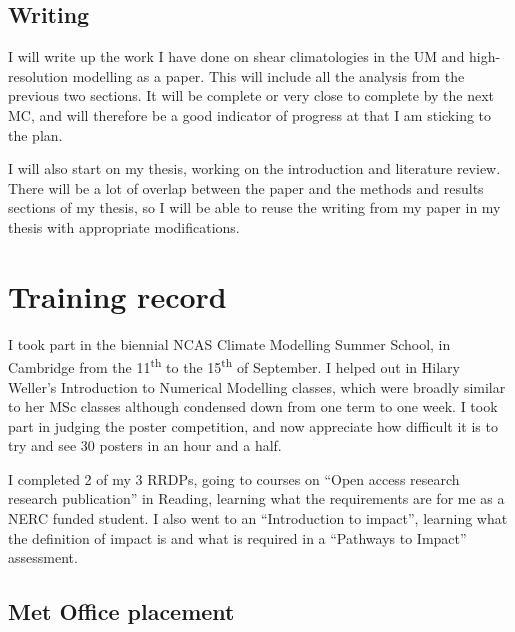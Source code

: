 \documentclass[11pt,a4paper]{article}
\newcommand{\ts}{\textsuperscript}
\begin{document}
\subsection{Writing}
\label{sec:Writing}

I will write up the work I have done on shear climatologies in the UM and high-resolution modelling as a paper. This will include all the analysis from the previous two sections. It will be complete or very close to complete by the next MC, and will therefore be a good indicator of progress at that I am sticking to the plan.

I will also start on my thesis, working on the introduction and literature review. There will be a lot of overlap between the paper and the methods and results sections of my thesis, so I will be able to reuse the writing from my paper in my thesis with appropriate modifications.

\section{Training record}
\label{sec:Training record}

I took part in the biennial NCAS Climate Modelling Summer School, in Cambridge from the 11\ts{th} to the 15\ts{th} of September. I helped out in Hilary Weller's Introduction to Numerical Modelling classes, which were broadly similar to her MSc classes although condensed down from one term to one week. 
I took part in judging the poster competition, and now appreciate how difficult it is to try and see 30 posters in an hour and a half. 

I completed 2 of my 3 RRDPs, going to courses on ``Open access research research publication'' in Reading, learning what the requirements are for me as a NERC funded student. I also went to an ``Introduction to impact'', learning what the definition of impact is and what is required in a ``Pathways to Impact'' assessment. 

\subsection{Met Office placement}
\label{sec:Met Office placement}
\end{document}
